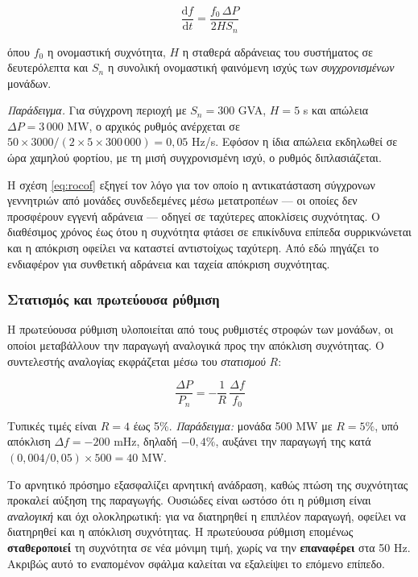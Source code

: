 \begin{equation}
\frac{\mathrm{d}f}{\mathrm{d}t} = \frac{f_0 \, \Delta P}{2 H S_n}
\label{eq:rocof}
\end{equation}

όπου $f_0$ η ονομαστική συχνότητα, $H$ η σταθερά αδράνειας του συστήματος σε δευτερόλεπτα
και $S_n$ η συνολική ονομαστική φαινόμενη ισχύς των \emph{συγχρονισμένων} μονάδων.

\emph{Παράδειγμα.} Για σύγχρονη περιοχή με $S_n = 300$ GVA, $H = 5$ s και απώλεια
$\Delta P = 3\,000$ MW, ο αρχικός ρυθμός ανέρχεται σε
$50 \times 3000 / (2 \times 5 \times 300\,000) = 0{,}05$ Hz/s. Εφόσον η ίδια απώλεια
εκδηλωθεί σε ώρα χαμηλού φορτίου, με τη μισή συγχρονισμένη ισχύ, ο ρυθμός διπλασιάζεται.

Η σχέση \eqref{eq:rocof} εξηγεί τον λόγο για τον οποίο η αντικατάσταση σύγχρονων
γεννητριών από μονάδες συνδεδεμένες μέσω μετατροπέων — οι οποίες δεν προσφέρουν εγγενή
αδράνεια — οδηγεί σε ταχύτερες αποκλίσεις συχνότητας. Ο διαθέσιμος χρόνος έως ότου η
συχνότητα φτάσει σε επικίνδυνα επίπεδα συρρικνώνεται και η απόκριση οφείλει να καταστεί
αντιστοίχως ταχύτερη. Από εδώ πηγάζει το ενδιαφέρον για συνθετική αδράνεια και ταχεία
απόκριση συχνότητας.

\subsubsection*{Στατισμός και πρωτεύουσα ρύθμιση}

Η πρωτεύουσα ρύθμιση υλοποιείται από τους ρυθμιστές στροφών των μονάδων, οι οποίοι
μεταβάλλουν την παραγωγή αναλογικά προς την απόκλιση συχνότητας. Ο συντελεστής αναλογίας
εκφράζεται μέσω του \emph{στατισμού} $R$:

\begin{equation}
\frac{\Delta P}{P_n} = -\frac{1}{R}\,\frac{\Delta f}{f_0}
\label{eq:droop}
\end{equation}

Τυπικές τιμές είναι $R = 4$ έως 5\%. \emph{Παράδειγμα:} μονάδα 500 MW με $R = 5\%$, υπό
απόκλιση $\Delta f = -200$ mHz, δηλαδή $-0{,}4\%$, αυξάνει την παραγωγή της κατά
$(0{,}004/0{,}05) \times 500 = 40$ MW.

Το αρνητικό πρόσημο εξασφαλίζει αρνητική ανάδραση, καθώς πτώση της συχνότητας προκαλεί
αύξηση της παραγωγής. Ουσιώδες είναι ωστόσο ότι η ρύθμιση είναι \emph{αναλογική} και όχι
ολοκληρωτική: για να διατηρηθεί η επιπλέον παραγωγή, οφείλει να διατηρηθεί και η απόκλιση
συχνότητας. Η πρωτεύουσα ρύθμιση επομένως \textbf{σταθεροποιεί} τη συχνότητα σε νέα μόνιμη
τιμή, χωρίς να την \textbf{επαναφέρει} στα 50 Hz. Ακριβώς αυτό το εναπομένον σφάλμα
καλείται να εξαλείψει το επόμενο επίπεδο.

